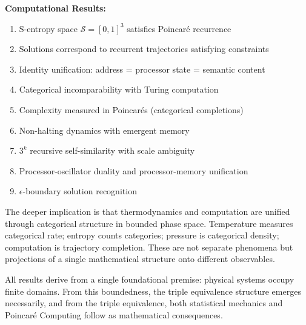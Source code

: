 \documentclass[twocolumn,10pt]{article}
\theoremstyle{plain}
\theoremstyle{definition}
\theoremstyle{remark}
\newcommand{\Sspace}{\mathcal{S}}
\begin{document}
\textbf{Computational Results:}
\begin{enumerate}
    \item S-entropy space $\Sspace = [0,1]^3$ satisfies Poincar\'e recurrence
    \item Solutions correspond to recurrent trajectories satisfying constraints
    \item Identity unification: address = processor state = semantic content
    \item Categorical incomparability with Turing computation
    \item Complexity measured in Poincar\'es (categorical completions)
    \item Non-halting dynamics with emergent memory
    \item $3^k$ recursive self-similarity with scale ambiguity
    \item Processor-oscillator duality and processor-memory unification
    \item $\epsilon$-boundary solution recognition
\end{enumerate}

The deeper implication is that thermodynamics and computation are unified through categorical structure in bounded phase space. Temperature measures categorical rate; entropy counts categories; pressure is categorical density; computation is trajectory completion. These are not separate phenomena but projections of a single mathematical structure onto different observables.

All results derive from a single foundational premise: physical systems occupy finite domains. From this boundedness, the triple equivalence structure emerges necessarily, and from the triple equivalence, both statistical mechanics and Poincar\'e Computing follow as mathematical consequences.



\end{document}
